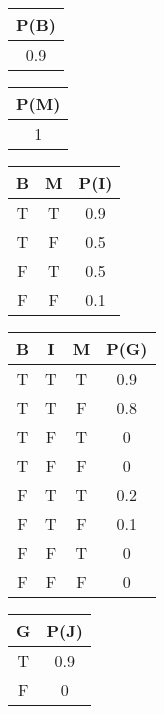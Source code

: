 \documentclass{article}
\begin{document}
\pagebreak
	 \begin{center}
	
\end{center}

\begin{minipage}{4cm}
	\begin{tabular}{|c|}
		\hline
		P(B) \\ \hline
		0.9  \\ \hline
	\end{tabular}
\end{minipage}
\begin{minipage}{4cm}
	\begin{tabular}{|c|}
		\hline
		P(M) \\ \hline
		1    \\ \hline
	\end{tabular}
\end{minipage}
\begin{minipage}{4cm}
	\begin{tabular}{|c|c|c|}
		\hline
		B & M & P(I) \\ \hline
		T & T & 0.9  \\ \hline
		T & F & 0.5  \\ \hline
		F & T & 0.5  \\ \hline
		F & F & 0.1  \\ \hline
	\end{tabular}
\end{minipage}
\begin{minipage}{4cm}
	\begin{tabular}{|c|c|c|c|}
		\hline
		B & I & M & P(G) \\ \hline
		T & T & T & 0.9  \\ \hline
		T & T & F & 0.8  \\ \hline
		T & F & T & 0    \\ \hline
		T & F & F & 0    \\ \hline
		F & T & T & 0.2  \\ \hline
		F & T & F & 0.1  \\ \hline
		F & F & T & 0    \\ \hline
		F & F & F & 0    \\ \hline
	\end{tabular}
\end{minipage}
\begin{tabular}{|c|c|}
	\hline
	G & P(J) \\ \hline
	T & 0.9  \\ \hline
	F & 0    \\ \hline
\end{tabular}
\end{document}
